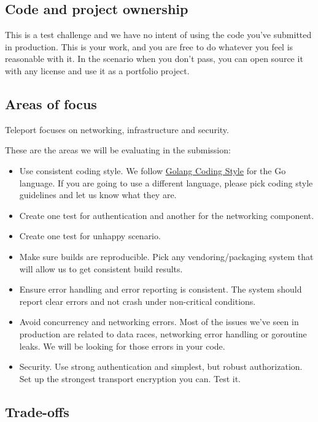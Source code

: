 \documentclass{article}
\begin{document}
\subsection{Code and project ownership}

This is a test challenge and we have no intent of using the code you've submitted in production.
This is your work, and you are free to do whatever you feel is reasonable with it.
In the scenario when you don't pass, you can open source it with any license and use it as a portfolio project.

\subsection{Areas of focus}

Teleport focuses on networking, infrastructure and security.

These are the areas we will be evaluating in the submission:

  \begin{itemize}
  \item Use consistent coding style. We follow \href{https://github.com/golang/go/wiki/CodeReviewComments}{Golang Coding Style} for the Go language. If you are going to use a different language, please pick coding style guidelines and let us know what they are.
  \item Create one test for authentication and another for the networking component.
  \item Create one test for unhappy scenario.
  \item Make sure builds are reproducible. Pick any vendoring/packaging system that will allow us to get consistent build results.
  \item Ensure error handling and error reporting is consistent. The system should report clear errors and not crash under non-critical conditions.
  \item Avoid concurrency and networking errors. Most of the issues we've seen in production are related to data races, networking error handling or goroutine leaks. We will be looking for those errors in your code.
  \item Security. Use strong authentication and simplest, but robust authorization. Set up the strongest transport encryption you can. Test it.
  \end{itemize}

\subsection{Trade-offs}
       
\end{document}
